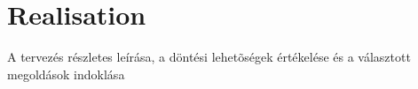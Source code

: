 \chapter{Realisation}
A tervezés részletes leírása, a döntési lehetõségek értékelése és a választott megoldások indoklása
